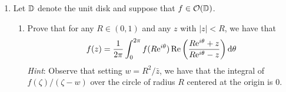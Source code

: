 \documentclass[../psets.tex]{subfiles}
\begin{document}
\begin{enumerate}[ref={A.\arabic*}]
\begin{enumerate}
\begin{proof}
            As in parts (a) and (b), the singularity is a \par
            As in part (b), we can calculate that
            \begin{equation*}
                g(z) = 0+0z+4ib\e[b]z^2+24b\e[b]z^3+\cdots
            \end{equation*}
            so  Inverting this back again, we learn that
            \begin{align*}
                b_0 &= -\frac{i}{4b\e[b]}&
                b_1 &= \frac{3}{2b\e[b]}
            \end{align*}
            so the principal part of $f$ at $z_0$ is
            \begin{equation*}
                \boxed{-\frac{i}{4b\e[b]}z^{-2}+\frac{3}{2b\e[b]}z^{-1}}
            \end{equation*}
        \end{proof}
        \item $(\sin z+\cos z-1)^{-2}$ at $z_0=0$.
        \begin{proof}
            As in parts (a)-(c), the singularity is a \par
            Once again, we can calculate that
            \begin{equation*}
                g(z) = 0+0z+z^2-z^3
            \end{equation*}
            so  And once again,
            \begin{align*}
                b_0 &= 1&
                b_1 &= 1
            \end{align*}
            so we have
            \begin{equation*}
                \boxed{z^{-2}+z^{-1}}
            \end{equation*}
        \end{proof}
    \end{enumerate}
    \item Let $\D$ denote the unit disk and suppose that $f\in\mO(\D)$.
    \begin{enumerate}
        \item Prove that for any $R\in(0,1)$ and any $z$ with $|z|<R$, we have that
        \begin{equation*}
            f(z) = \frac{1}{2\pi}\int_0^{2\pi}f(R\e[i\theta])\re\left( \frac{R\e[i\theta]+z}{R\e[i\theta]-z} \right)\dd\theta
        \end{equation*}
        \emph{Hint}: Observe that setting $w=R^2/\bar{z}$, we have that the integral of $f(\zeta)/(\zeta-w)$ over the circle of radius $R$ centered at the origin is 0.

\end{enumerate}
\end{enumerate}
\end{document}
